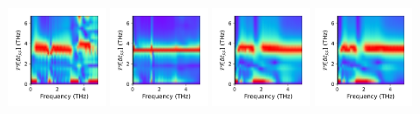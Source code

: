 \documentclass[a4paper]{article}
\begin{document}
\begin{figure}[H]
  \centering
  \includegraphics[width=0.23\textwidth]{cond_w_pcolor-A3-v5-imp0.pdf}
  \includegraphics[width=0.23\textwidth]{cond_w_pcolor-A3-v5-imp1.pdf}
  \includegraphics[width=0.23\textwidth]{cond_w_pcolor-A3-v5-imp2.pdf}
  \includegraphics[width=0.23\textwidth]{cond_w_pcolor-A3-v5-imp3.pdf}
\end{figure}
\end{document}
